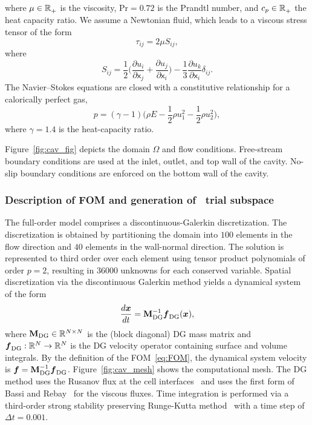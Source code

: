 where $\mu \in \mathbb{R}^{}_{+}$ is the viscosity, $\text{Pr} = 0.72$ is the Prandtl number, and $c_p \in \mathbb{R}^{}_{+}$ the heat capacity ratio.
We assume a Newtonian fluid, which leads to a viscous stress tensor of the form
\begin{equation*}
\tau_{ij} = 2\mu S_{ij},
\end{equation*}
where
\begin{equation*}
 S_{ij} = \frac{1}{2} \big( \frac{\partial u_i}{\partial \mathsf{x}_j} + \frac{\partial u_j}{\partial \mathsf{x}_i} \big) - \frac{1}{3} \frac{\partial      u_k}{\partial \mathsf{x}_i} \delta_{ij}.
\end{equation*}
The Navier--Stokes equations are closed with a constitutive relationship for a calorically perfect gas,
$$p = (\gamma - 1)( \rho E - \frac{1}{2} \rho u_1^2 - \frac{1}{2} \rho u_2^2 \big),$$
where $\gamma = 1.4$ is the heat-capacity ratio.

Figure~\ref{fig:cav_fig} depicts the domain $\Omega$ and flow conditions. Free-stream boundary conditions 
are used at the inlet, outlet, and top wall of the cavity. No-slip boundary conditions are enforced 
on the bottom wall of the cavity. 

\subsubsection{Description of FOM and generation of \spatialAcronym\ trial subspace}
The full-order model comprises a discontinuous-Galerkin discretization. The discretization 
is obtained by partitioning the domain into $100$ elements in the flow direction and $40$ elements 
in the wall-normal direction. The solution is represented to third order over each element using tensor product polynomials of order $p=2$, 
resulting in $36000$ unknowns for each conserved variable. Spatial discretization via the discontinuous Galerkin method yields a dynamical system 
of the form
$$\frac{d \boldsymbol x}{dt} = \mathbf{M}_{\text{DG}}^{-1} \boldsymbol f_{\text{DG}} (\boldsymbol x),$$
where $\mathbf{M}_{\text{DG}} \in \mathbb{R}^{N \times N}$ is the (block diagonal) DG mass matrix and $\boldsymbol f_{\text{DG}}: \mathbb{R}^{N} \rightarrow \mathbb{R}^{N}$ is the DG velocity operator containing 
surface and volume integrals. By the definition of the FOM~\eqref{eq:FOM}, the dynamical system velocity is $\boldsymbol f = \mathbf{M}_{\text{DG}}^{-1} \boldsymbol f_{\text{DG}}$. 
Figure~\ref{fig:cav_mesh} shows the computational mesh. The 
DG method uses the Rusanov flux at the cell interfaces~\cite{rusanov} and uses the first form of Bassi and Rebay~\cite{br1} for the viscous fluxes. Time integration 
is performed via a third-order strong stability preserving Runge-Kutta method~\cite{ssp_rk3} with a time step of $\Delta t = 0.001$. 
 
